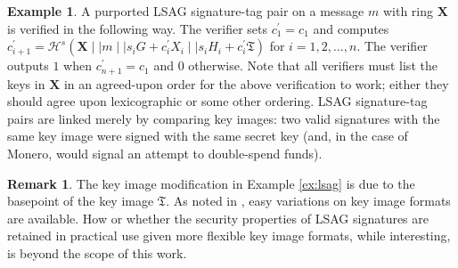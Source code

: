 \documentclass{article}
\theoremstyle{plain}
\theoremstyle{definition}
\newtheorem{remark}{Remark}[section]
\newtheorem{example}{Example}[section]
\begin{document}
\begin{example}
A purported LSAG signature-tag pair on a message $m$ with ring $\textbf{X}$ is verified in the following way. The verifier sets $c_1^\prime = c_1$ and computes $c_{i+1}^\prime = \mathcal{H}^s(\textbf{X} \mid \mid m \mid \mid s_i G + c_i^\prime X_i \mid \mid s_i H_i + c_i^\prime \mathfrak{T})$ for $i=1, 2, \ldots, n$. The verifier outputs $1$ when $c_{n+1}^\prime = c_1$ and $0$ otherwise. Note that all verifiers must list the keys in $\textbf{X}$ in an agreed-upon order for the above verification to work; either they should agree upon lexicographic or some other ordering.  LSAG signature-tag pairs are linked merely by comparing key images: two valid signatures with the same key image were signed with the same secret key (and, in the case of Monero, would signal an attempt to double-spend funds).
\end{example}

\begin{remark}
The key image modification in Example \ref{ex:lsag} is due to the basepoint of the key image $\mathfrak{T}$. As noted in \cite{liu2004linkable}, easy variations on key image formats are available. How or whether the security properties of LSAG signatures are retained in practical use given more flexible key image formats, while interesting, is beyond the scope of this work.
\end{remark}
\end{document}
